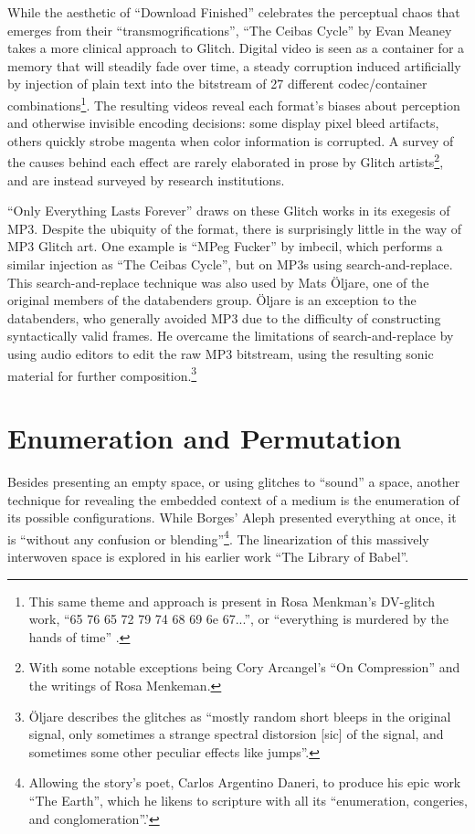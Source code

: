 \documentclass{thesis}
\begin{document}
While the aesthetic of ``Download Finished'' celebrates the perceptual chaos that emerges from their ``transmogrifications'', ``The Ceibas Cycle'' by Evan Meaney\cite{evan_meaney_ceibas:_2008} takes a more clinical approach to Glitch. Digital video is seen as a container for a memory that will steadily fade over time, a steady corruption induced artificially by injection of plain text into the bitstream of 27 different codec/container combinations\footnote{This same theme and approach is present in Rosa Menkman's DV-glitch work, ``65 76 65 72 79 74 68 69 6e 67...'', or ``everything is murdered by the hands of time'' \cite{rosa_menkman_65_2010}.}. The resulting videos reveal each format's biases about perception and otherwise invisible encoding decisions: some display pixel bleed artifacts, others quickly strobe magenta when color information is corrupted. A survey of the causes behind each effect are rarely elaborated in prose by Glitch artists\footnote{With some notable exceptions being Cory Arcangel's ``On Compression''\cite{cory_arcangel_c_2008} and the writings of Rosa Menkeman\cite{rosa_menkman_compression_2010}.}, and are instead surveyed by research institutions\cite{nikolai_trunichkin_and_dr._dmitriy_vatolin_crazy_????}.

``Only Everything Lasts Forever'' draws on these Glitch works in its exegesis of MP3. Despite the ubiquity of the format, there is surprisingly little in the way of MP3 Glitch art. One example is ``MPeg Fucker'' by imbecil\cite{imbecil_mpeg_2004}, which performs a similar injection as ``The Ceibas Cycle'', but on MP3s using search-and-replace. This search-and-replace technique was also used by Mats \"Oljare, one of the original members of the databenders group. \"Oljare is an exception to the databenders, who generally avoided MP3 due to the difficulty of constructing syntactically valid frames. He overcame the limitations of search-and-replace by using audio editors to edit the raw MP3 bitstream, using the resulting sonic material for further composition.\footnote{\"Oljare describes the glitches as ``mostly random short bleeps in the original signal, only sometimes a strange spectral distorsion [sic] of the signal, and sometimes some other peculiar effects like jumps''.\cite{oljare}}

\section{Enumeration and Permutation}
	
Besides presenting an empty space, or using glitches to ``sound'' a space, another technique for revealing the embedded context of a medium is the enumeration of its possible configurations. While Borges' Aleph presented everything at once, it is ``without any confusion or blending''\footnote{Allowing the story's poet, Carlos Argentino Daneri, to produce his epic work ``The Earth'', which he likens to scripture with all its ``enumeration, congeries, and conglomeration''.'}. The linearization of this massively interwoven space is explored in his earlier work ``The Library of Babel''\cite{borges_library_2000}.
	
\end{document}
